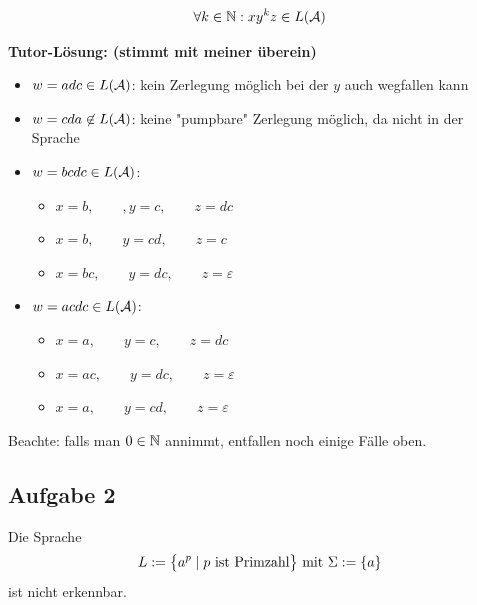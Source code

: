\begin{align}\label{eqAufgabe1}
	\forall k\in\N:xy^kz\in L(\A)
\end{align}

\textbf{Tutor-Lösung: (stimmt mit meiner überein)}
\begin{itemize}
	\item $w=adc\in L(\A)$: kein Zerlegung möglich bei der $y$ auch wegfallen kann
	\item $w=cda\not\in L(\A)$: keine "pumpbare" Zerlegung möglich, da nicht in der Sprache
	\item $w=bcdc\in L(\A)$:
	\begin{itemize}
		\item $x=b,\qquad,y=c,\qquad z=dc$
		\item $x=b,\qquad y=cd,\qquad z=c$
		\item $x=bc,\qquad y=dc,\qquad z=\varepsilon$
	\end{itemize}
	\item $w=acdc\in L(\A)$:
	\begin{itemize}
		\item $x=a,\qquad y=c,\qquad z=dc$
		\item $x=ac,\qquad y=dc,\qquad z=\varepsilon$
		\item $x=a,\qquad y=cd,\qquad z=\varepsilon$ 
	\end{itemize}
\end{itemize}

Beachte: falls man $0\in\N$ annimmt, entfallen noch einige Fälle oben.

\subsection{Aufgabe 2}
Die Sprache
\begin{align*}
	L:=\big\lbrace a^p\mid p\text{ ist Primzahl}\big\rbrace\mit\Sigma:=\lbrace a\rbrace
\end{align*}
ist nicht erkennbar.

